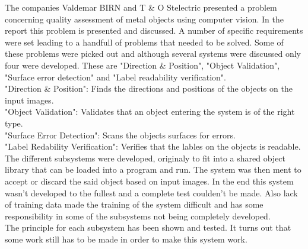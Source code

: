 The companies Valdemar BIRN and T \& O Stelectric presented a problem concerning quality assessment of metal objects using computer vision. In the report this problem is presented and discussed. A number of specific requirements were set leading to a handfull of problems that needed to be solved.  Some of these problems were picked out and although several systems were discussed only four were developed. These are "Direction \& Position", "Object Validation", "Surface error detection" and "Label readability verification".\\
"Direction \& Position": Finds the directions and positions of the objects on the input images. \\
"Object Validation": Validates that an object entering the system is of the right type. \\
"Surface Error Detection": Scans the objects surfaces for errors. \\ 
"Label Redability Verification": Verifies that the lables on the objects is readable. \\ 

The different subsystems were developed, originaly to fit into a shared object library that can be loaded into a program and run. The system was then ment to accept or discard the said object based on input images. In the end this system wasn't developed to the fullest and a complete test coulden't be made. Also lack of training data made the training of the system difficult and has some responsibility in some of the subsystems not being completely developed.\\
The principle for each subsystem has been shown and tested. It turns out that some work still has to be made in order to make this system work.
